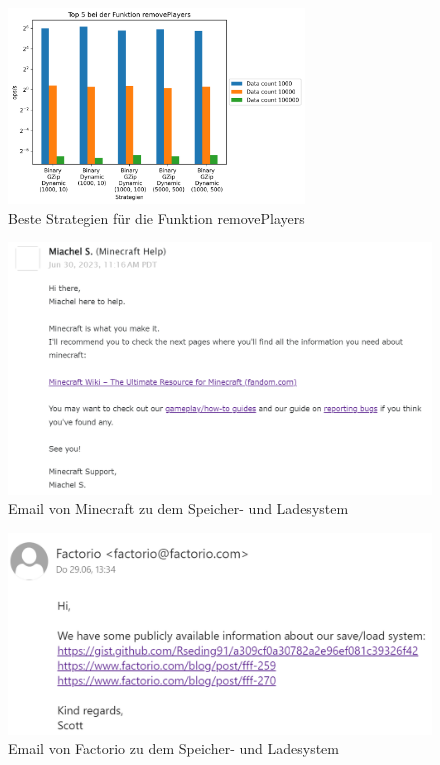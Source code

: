 \begin{figure}[htp]
    \centering
    \includegraphics[width=0.7\textwidth]{images/plots/removePlayers.png}
    \caption{Beste Strategien für die Funktion removePlayers}
    \label{fig:removePlayers}
\end{figure}

\begin{figure}[htp]
    \centering
    \includegraphics[width=1\textwidth]{images/Minecraft_Email.png}
    \caption{Email von Minecraft zu dem Speicher- und Ladesystem}
    \label{fig:minecraftMail}
\end{figure}

\begin{figure}[htp]
    \centering
    \includegraphics[width=1\textwidth]{images/Factorio_Email.png}
    \caption{Email von Factorio zu dem Speicher- und Ladesystem}
    \label{fig:factorioMail}
\end{figure}
